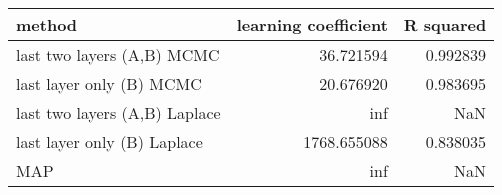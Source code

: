 \begin{tabular}{lrr}
\toprule
                        method &  learning coefficient &  R squared \\
\midrule
    last two layers (A,B) MCMC &             36.721594 &   0.992839 \\
      last layer only (B) MCMC &             20.676920 &   0.983695 \\
 last two layers (A,B) Laplace &                   inf &        NaN \\
   last layer only (B) Laplace &           1768.655088 &   0.838035 \\
                           MAP &                   inf &        NaN \\
\bottomrule
\end{tabular}
